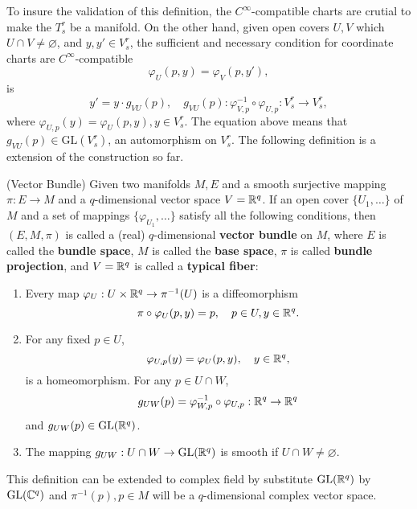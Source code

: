 To insure the validation of this definition, the $C^\infty$-compatible charts are crutial to make the $T^r_s$ be a manifold. On the other hand, given open covers $U,V$ which $U\cap V\ne \varnothing$, and $y,y'\in V^r_s$, the sufficient and necessary condition for coordinate charts are $C^\infty$-compatible 
\begin{equation}
\varphi_U(p,y)=\varphi_V(p,y'),
\end{equation}
is
\begin{equation}
y'=y\cdot g_{VU}(p),\quad g_{VU}(p):\varphi^{-1}_{V,p}\circ\varphi_{U,p}:V^r_s\to V^r_s,
\end{equation}
where $\varphi_{U,p}(y) = \varphi_{U}(p,y),y\in V^r_s$. The equation above means that $g_{VU}(p)\in \text{GL}(V^r_s)$, an automorphism on $V^r_s$. The following definition is a extension of the construction so far.


\begin{definition}(Vector Bundle)
Given two manifolds $M, E$ and a smooth surjective mapping $\pi:E\to M$ and a $q$-dimensional vector space $V=\mathbb{R}^q$. If an open cover $\{U_1,\dots\}$ of $M$ and a set of mappings $\{\varphi_{U_1},\dots\}$ satisfy all the following conditions, then $(E,M,\pi)$ is called a (real) $q$-dimensional \textbf{vector bundle} on $M$, where $E$ is called the \textbf{bundle space}, $M$ is called the \textbf{base space}, $\pi$ is called \textbf{bundle projection}, and $V=\mathbb{R}^q$ is called a \textbf{typical fiber}:
\begin{enumerate}
\item Every map $\varphi_U:U\times \mathbb{R}^q\to\pi^{-1}(U)$ is a diffeomorphism
\begin{equation}
\pi\circ\varphi_U(p,y)=p,\quad p\in U,y\in\mathbb{R}^q.
\end{equation}
\item For any fixed $p\in U$,\
\begin{equation}
\varphi_{U,p}(y)=\varphi_U(p,y),\quad y\in\mathbb{R}^q,
\end{equation}
is a homeomorphism. For any $p\in U\cap W$,
\begin{equation}
g_{UW}(p)=\varphi_{W,p}^{-1}\circ\varphi_{U,p}:\mathbb{R}^q\to\mathbb{R}^q
\end{equation}
and $g_{UW}(p)\in \text{GL}(\mathbb{R}^q)$.
\item The mapping $g_{UW}:U\cap W\to \text{GL}(\mathbb{R}^q)$ is smooth if $U\cap W\ne\varnothing$.
\end{enumerate}
This definition can be extended to complex field by substitute $\text{GL}(\mathbb{R}^q)$ by $\text{GL}(\mathbb{C}^q)$ and $\pi^{-1}(p),p\in M$ will be a $q$-dimensional complex vector space. 
\end{definition}

\begin{theorem}

\end{theorem}